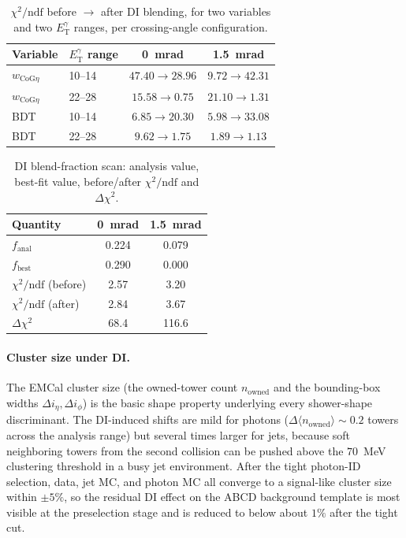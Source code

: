 \documentclass[11pt]{article}
\newcommand{\ETg}{E_{\mathrm{T}}^{\gamma}}
\begin{document}
\begin{table}[h]
\centering
\caption{$\chi^2/\mathrm{ndf}$ before $\to$ after DI blending, for two variables
and two $\ETg$ ranges, per crossing-angle configuration.}
\label{tab:dichi2}
\begin{tabular}{llcc}
\toprule
Variable & $\ETg$ range & 0~mrad & 1.5~mrad \\
\midrule
$w_{\mathrm{CoG}\eta}$ & 10--14 & $47.40\to28.96$ & $9.72\to42.31$ \\
$w_{\mathrm{CoG}\eta}$ & 22--28 & $15.58\to0.75$  & $21.10\to1.31$ \\
BDT                    & 10--14 & $6.85\to20.30$  & $5.98\to33.08$ \\
BDT                    & 22--28 & $9.62\to1.75$   & $1.89\to1.13$  \\
\bottomrule
\end{tabular}
\end{table}

\begin{table}[h]
\centering
\caption{DI blend-fraction scan: analysis value, best-fit value, before/after
$\chi^2/\mathrm{ndf}$ and $\Delta\chi^2$.}
\label{tab:discan}
\begin{tabular}{lcc}
\toprule
Quantity & 0~mrad & 1.5~mrad \\
\midrule
$f_{\mathrm{anal}}$ & 0.224 & 0.079 \\
$f_{\mathrm{best}}$ & 0.290 & 0.000 \\
$\chi^2/\mathrm{ndf}$ (before) & 2.57 & 3.20 \\
$\chi^2/\mathrm{ndf}$ (after)  & 2.84 & 3.67 \\
$\Delta\chi^2$ & 68.4 & 116.6 \\
\bottomrule
\end{tabular}
\end{table}

\paragraph{Cluster size under DI.} The EMCal cluster size (the owned-tower count
$n_{\mathrm{owned}}$ and the bounding-box widths $\Delta i_\eta,\Delta i_\phi$) is
the basic shape property underlying every shower-shape discriminant. The
DI-induced shifts are mild for photons ($\Delta\langle n_{\mathrm{owned}}\rangle
\sim0.2$ towers across the analysis range) but several times larger for jets,
because soft neighboring towers from the second collision can be pushed above the
$70$~MeV clustering threshold in a busy jet environment. After the tight photon-ID
selection, data, jet MC, and photon MC all converge to a signal-like cluster size
within $\pm5\%$, so the residual DI effect on the ABCD background template is most
visible at the preselection stage and is reduced to below about $1\%$ after the
tight cut.
\end{document}
